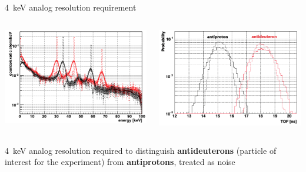 \documentclass[aspectratio=169,xcolor=dvipsnamesz]{beamer} %
\begin{document}

\begin{frame}{\SI{4}{\kilo\electronvolt} analog resolution requirement}
    \begin{columns}
            \centering
            \includegraphics[height=0.47\textheight]{images/backup_slides/antiproton_antideuteron_1.png}

            \centering
            \includegraphics[height=0.47\textheight]{images/backup_slides/antiproton_antideuteron_2.png}
    \end{columns}

    \vspace{0.5cm}
    \begin{columns}
            \centering
             \SI{4}{\kilo\electronvolt} analog resolution required to distinguish \textbf{antideuterons} (particle of interest for the experiment) from \textbf{antiprotons}, treated as noise
    \end{columns}
\end{frame}
\end{document}
